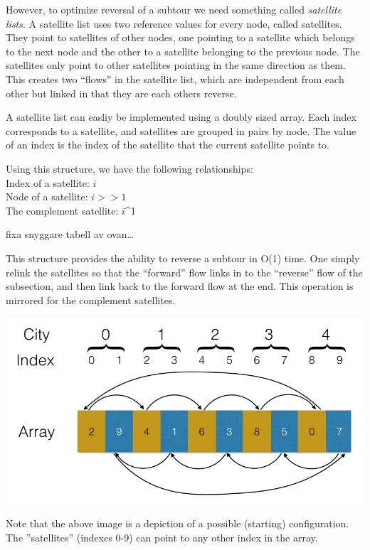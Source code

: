\documentclass[paper=a4, fontsize=11pt,numbers=endperiod]{scrartcl} %
\numberwithin{equation}{section} %
\numberwithin{figure}{section} %
\numberwithin{table}{section} %
\begin{document}
However, to optimize reversal of a subtour we need something called \emph{satellite lists}.\cite{satellite}
A satellite list uses two reference values for every node, called satellites.
They point to satellites of other nodes, one pointing to a satellite which belongs to the next node and the other to a satellite belonging to the previous node.
The satellites only point to other satellites pointing in the same direction as them.
This creates two ``flows'' in the satellite list, which are independent from each other but linked in that they are each others reverse.

A satellite list can easliy be implemented using a doubly sized array.
Each index corresponds to a satellite, and satellites are grouped in pairs by node.
The value of an index is the index of the satellite that the current satellite points to.

Using this structure, we have the following relationships:\\
Index of a satellite: $i$\\
Node of a satellite: $i>>1$\\
The complement satellite: $i$\^{}1

fixa snyggare tabell av ovan\dots

This structure provides the ability to reverse a subtour in O(1) time.
One simply relink the satellites so that the ``forward'' flow links in to the ``reverse'' flow of the subsection, and then link back to the forward flow at the end.
This operation is mirrored for the complement satellites.

\begin{center}
\includegraphics[scale=0.3]{satellite}
\end{center}

Note that the above image is a depiction of a possible (starting) configuration. The ''satellites'' (indexes 0-9) can point to any other index in the array.
\end{document}
